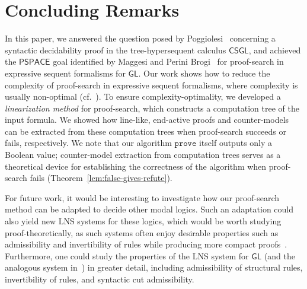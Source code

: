 \documentclass[copyright,creativecommons]{eptcs}
\newcommand{\logicgl}{\mathsf{GL}}
\newcommand{\calc}{\mathsf{CSGL}}
\newcommand{\prove}{\mathtt{prove}}
\newcommand{\pspace}{\mathsf{PSPACE}}
\begin{document}
\section{Concluding Remarks}\label{sec:conc}



In this paper, we answered the question posed by
Poggiolesi~\cite{Pog09b} concerning a syntactic decidability
proof in the tree-hypersequent calculus $\calc$,
and achieved the $\pspace$ goal identified by Maggesi and Perini Brogi~\cite{MagPer23} for proof-search in expressive sequent formalisms for $\logicgl$. Our work shows how to reduce the complexity of proof-search in expressive sequent formalisms, where complexity is usually non-optimal (cf.~\cite{MagPer23}). To ensure complexity-optimality, we developed a \emph{linearization method} for proof-search, which constructs a computation tree of the input formula. We showed how line-like, end-active proofs and counter-models can be extracted from these computation trees when proof-search succeeds or fails, respectively. We note that our algorithm $\prove$ itself outputs only a Boolean value; counter-model extraction from computation trees serves as a theoretical device for establishing the correctness of the algorithm when proof-search fails (Theorem~\ref{lem:false-gives-refute}).





For future work, it would be interesting to investigate how our proof-search method can be adapted to decide other modal logics. Such an adaptation could also yield new LNS systems for these logics, which would be worth studying proof-theoretically, as such systems often enjoy desirable properties such as admissibility and invertibility of rules while producing more compact proofs~\cite{Lel15,Lyo25}. Furthermore, one could study the properties of the LNS system for $\logicgl$ (and the analogous system in~\cite{Lyo25}) in greater detail, including admissibility of structural rules, invertibility of rules, and syntactic cut admissibility.






\end{document}
